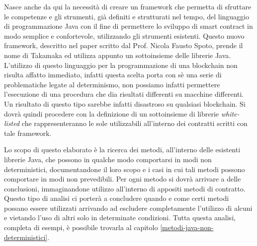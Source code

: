 Nasce anche da qui la necessità di creare un framework che permetta di sfruttare le competenze e gli strumenti, già definiti e strutturati nel tempo, del linguaggio di programmazione Java con il fine di permettere lo sviluppo di smart contract in modo semplice e confortevole, utilizzando gli strumenti esistenti. Questo nuovo framework, descritto nel paper \cite{paper-takamaka:spoto} scritto dal Prof. Nicola Fausto Spoto, prende il nome di Takamaka ed utilizza appunto un sottoinsieme delle librerie Java. L'utilizzo di questo linguaggio per la programmazione di una blockchain non risulta affatto immediato, infatti questa scelta porta con sè una serie di problematiche legate al determinismo, non possiamo infatti permettere l'esecuzione di una procedura che dia risultati differenti su macchine differenti. Un risultato di questo tipo sarebbe infatti disastroso su qualsiasi blockchain. Si dovrà quindi procedere con la definizione di un sottoinsieme di librerie \textit{white-listed} che rappresenteranno le sole utilizzabili all'interno dei contratti scritti con tale framework.

Lo scopo di questo elaborato è la ricerca dei metodi, all'interno delle esistenti librerie Java, che possono in qualche modo comportarsi in modi non deterministici, documentandone il loro scopo e i casi in cui tali metodi possono comportare in modi non prevedibili. Per ogni metodo si dovrà arrivare a delle conclusioni, immaginandone utilizzo all'interno di appositi metodi di contratto. Questo tipo di analisi ci porterà a concludere quando e come certi metodi possano essere utilizzati arrivando ad escludere completamente l'utilizzo di alcuni e vietando l'uso di altri solo in determinate condizioni. Tutta questa analisi, completa di esempi, è possibile trovarla al capitolo \ref{metodi-java-non-deterministici}.